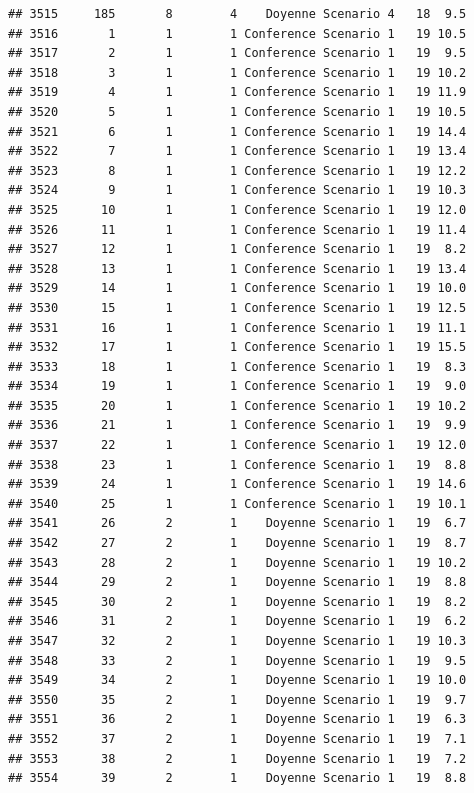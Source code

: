 \documentclass[
]{article}
\begin{document}
\begin{verbatim}
## 3515     185       8        4    Doyenne Scenario 4   18  9.5
## 3516       1       1        1 Conference Scenario 1   19 10.5
## 3517       2       1        1 Conference Scenario 1   19  9.5
## 3518       3       1        1 Conference Scenario 1   19 10.2
## 3519       4       1        1 Conference Scenario 1   19 11.9
## 3520       5       1        1 Conference Scenario 1   19 10.5
## 3521       6       1        1 Conference Scenario 1   19 14.4
## 3522       7       1        1 Conference Scenario 1   19 13.4
## 3523       8       1        1 Conference Scenario 1   19 12.2
## 3524       9       1        1 Conference Scenario 1   19 10.3
## 3525      10       1        1 Conference Scenario 1   19 12.0
## 3526      11       1        1 Conference Scenario 1   19 11.4
## 3527      12       1        1 Conference Scenario 1   19  8.2
## 3528      13       1        1 Conference Scenario 1   19 13.4
## 3529      14       1        1 Conference Scenario 1   19 10.0
## 3530      15       1        1 Conference Scenario 1   19 12.5
## 3531      16       1        1 Conference Scenario 1   19 11.1
## 3532      17       1        1 Conference Scenario 1   19 15.5
## 3533      18       1        1 Conference Scenario 1   19  8.3
## 3534      19       1        1 Conference Scenario 1   19  9.0
## 3535      20       1        1 Conference Scenario 1   19 10.2
## 3536      21       1        1 Conference Scenario 1   19  9.9
## 3537      22       1        1 Conference Scenario 1   19 12.0
## 3538      23       1        1 Conference Scenario 1   19  8.8
## 3539      24       1        1 Conference Scenario 1   19 14.6
## 3540      25       1        1 Conference Scenario 1   19 10.1
## 3541      26       2        1    Doyenne Scenario 1   19  6.7
## 3542      27       2        1    Doyenne Scenario 1   19  8.7
## 3543      28       2        1    Doyenne Scenario 1   19 10.2
## 3544      29       2        1    Doyenne Scenario 1   19  8.8
## 3545      30       2        1    Doyenne Scenario 1   19  8.2
## 3546      31       2        1    Doyenne Scenario 1   19  6.2
## 3547      32       2        1    Doyenne Scenario 1   19 10.3
## 3548      33       2        1    Doyenne Scenario 1   19  9.5
## 3549      34       2        1    Doyenne Scenario 1   19 10.0
## 3550      35       2        1    Doyenne Scenario 1   19  9.7
## 3551      36       2        1    Doyenne Scenario 1   19  6.3
## 3552      37       2        1    Doyenne Scenario 1   19  7.1
## 3553      38       2        1    Doyenne Scenario 1   19  7.2
## 3554      39       2        1    Doyenne Scenario 1   19  8.8

\end{verbatim}
\end{document}
